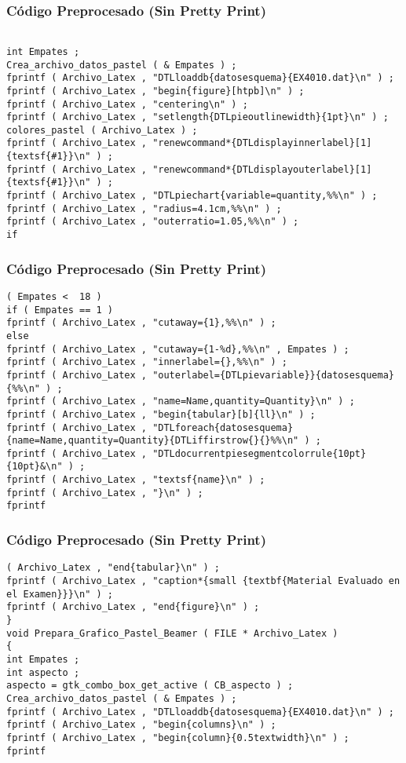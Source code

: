 \documentclass{beamer}
\begin{document}
\begin{frame}[fragile]
\frametitle{C\'odigo Preprocesado (Sin Pretty Print)}
\begin{lstlisting}[style=CStyle]

int Empates ; 
Crea_archivo_datos_pastel ( & Empates ) ; 
fprintf ( Archivo_Latex , "DTLloaddb{datosesquema}{EX4010.dat}\n" ) ; 
fprintf ( Archivo_Latex , "begin{figure}[htpb]\n" ) ; 
fprintf ( Archivo_Latex , "centering\n" ) ; 
fprintf ( Archivo_Latex , "setlength{DTLpieoutlinewidth}{1pt}\n" ) ; 
colores_pastel ( Archivo_Latex ) ; 
fprintf ( Archivo_Latex , "renewcommand*{DTLdisplayinnerlabel}[1]{textsf{#1}}\n" ) ; 
fprintf ( Archivo_Latex , "renewcommand*{DTLdisplayouterlabel}[1]{textsf{#1}}\n" ) ; 
fprintf ( Archivo_Latex , "DTLpiechart{variable=quantity,%%\n" ) ; 
fprintf ( Archivo_Latex , "radius=4.1cm,%%\n" ) ; 
fprintf ( Archivo_Latex , "outerratio=1.05,%%\n" ) ; 
if \end{lstlisting}
\end{frame}
\begin{frame}[fragile]
\frametitle{C\'odigo Preprocesado (Sin Pretty Print)}
\begin{lstlisting}[style=CStyle]
( Empates <  18 ) 
if ( Empates == 1 ) 
fprintf ( Archivo_Latex , "cutaway={1},%%\n" ) ; 
else 
fprintf ( Archivo_Latex , "cutaway={1-%d},%%\n" , Empates ) ; 
fprintf ( Archivo_Latex , "innerlabel={},%%\n" ) ; 
fprintf ( Archivo_Latex , "outerlabel={DTLpievariable}}{datosesquema}{%%\n" ) ; 
fprintf ( Archivo_Latex , "name=Name,quantity=Quantity}\n" ) ; 
fprintf ( Archivo_Latex , "begin{tabular}[b]{ll}\n" ) ; 
fprintf ( Archivo_Latex , "DTLforeach{datosesquema}{name=Name,quantity=Quantity}{DTLiffirstrow{}{}%%\n" ) ; 
fprintf ( Archivo_Latex , "DTLdocurrentpiesegmentcolorrule{10pt}{10pt}&\n" ) ; 
fprintf ( Archivo_Latex , "textsf{name}\n" ) ; 
fprintf ( Archivo_Latex , "}\n" ) ; 
fprintf \end{lstlisting}
\end{frame}
\begin{frame}[fragile]
\frametitle{C\'odigo Preprocesado (Sin Pretty Print)}
\begin{lstlisting}[style=CStyle]
( Archivo_Latex , "end{tabular}\n" ) ; 
fprintf ( Archivo_Latex , "caption*{small {textbf{Material Evaluado en el Examen}}}\n" ) ; 
fprintf ( Archivo_Latex , "end{figure}\n" ) ; 
} 
void Prepara_Grafico_Pastel_Beamer ( FILE * Archivo_Latex ) 
{ 
int Empates ; 
int aspecto ; 
aspecto = gtk_combo_box_get_active ( CB_aspecto ) ; 
Crea_archivo_datos_pastel ( & Empates ) ; 
fprintf ( Archivo_Latex , "DTLloaddb{datosesquema}{EX4010.dat}\n" ) ; 
fprintf ( Archivo_Latex , "begin{columns}\n" ) ; 
fprintf ( Archivo_Latex , "begin{column}{0.5textwidth}\n" ) ; 
fprintf \end{lstlisting}
\end{frame}
\end{document}
